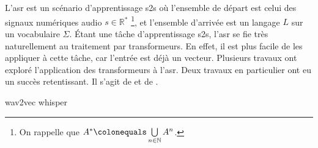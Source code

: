\section{}
\label{sec.asr}

L'\gls{asr} est un scénario d'apprentissage \gls{s2s} où 
l'ensemble de départ est celui des signaux numériques audio \(s\in\mathbb{R}^\ast\)%
\footnote{%
   On rappelle que \(A^\ast \colonequals \bigcup\limits_{n\in\mathbb{N}} A^n\).
}, %
et l'ensemble d'arrivée est un langage \(L\) sur un vocabulaire \(\Sigma\).
Étant une tâche d'apprentissage \gls{s2s}, l'\gls{asr} se fie très naturellement au traitement par transformeurs.
En effet, il est plus facile de les appliquer à cette tâche, car l'entrée est déjà un vecteur.
Plusieurs travaux ont exploré l'application des transformeurs à l'\gls{asr}.
Deux travaux en particulier ont eu un succès retentissant.
Il s'agit de \cite{Schneider_Baevski_Collobert_Auli_2019} 
et de \cite{Radford_Kim_Xu_Brockman_McLeavey_Sutskever_2022}.

{wav2vec}
{whisper}
